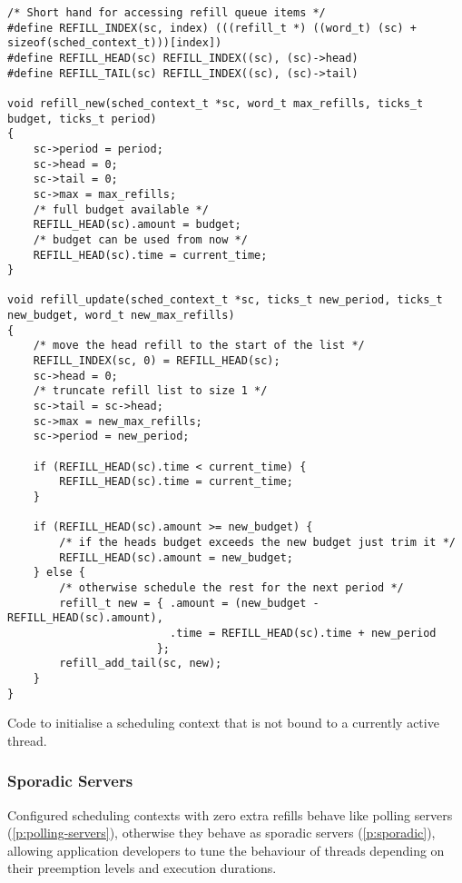 \begin{listing}[h!]
\begin{verbatim}
/* Short hand for accessing refill queue items */
#define REFILL_INDEX(sc, index) (((refill_t *) ((word_t) (sc) + sizeof(sched_context_t)))[index])
#define REFILL_HEAD(sc) REFILL_INDEX((sc), (sc)->head)
#define REFILL_TAIL(sc) REFILL_INDEX((sc), (sc)->tail)

void refill_new(sched_context_t *sc, word_t max_refills, ticks_t budget, ticks_t period)
{
    sc->period = period;
    sc->head = 0;
    sc->tail = 0;
    sc->max = max_refills;
    /* full budget available */
    REFILL_HEAD(sc).amount = budget;
    /* budget can be used from now */
    REFILL_HEAD(sc).time = current_time;
}

void refill_update(sched_context_t *sc, ticks_t new_period, ticks_t new_budget, word_t new_max_refills)
{
    /* move the head refill to the start of the list */
    REFILL_INDEX(sc, 0) = REFILL_HEAD(sc);
    sc->head = 0;
    /* truncate refill list to size 1 */
    sc->tail = sc->head;
    sc->max = new_max_refills;
    sc->period = new_period;

    if (REFILL_HEAD(sc).time < current_time) {
        REFILL_HEAD(sc).time = current_time;
    }

    if (REFILL_HEAD(sc).amount >= new_budget) {
        /* if the heads budget exceeds the new budget just trim it */
        REFILL_HEAD(sc).amount = new_budget;
    } else {
        /* otherwise schedule the rest for the next period */
        refill_t new = { .amount = (new_budget - REFILL_HEAD(sc).amount),
                         .time = REFILL_HEAD(sc).time + new_period
                       };
        refill_add_tail(sc, new);
    }
}
\end{verbatim}
\caption{Code to initialise a scheduling context that is not bound to a currently active thread.}
\label{list:refill-init}
\end{listing}

\subsubsection{Sporadic Servers}
\label{sec:impl-sporadic}

Configured scheduling contexts with zero extra refills behave like polling servers (\cref{p:polling-servers}),
otherwise they behave as sporadic servers (\cref{p:sporadic}), allowing application developers to
tune the behaviour of threads depending on their preemption levels and execution durations.

